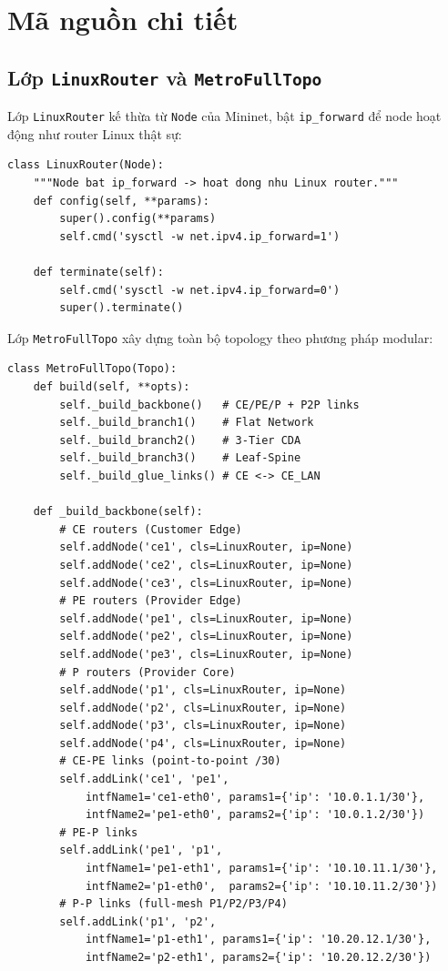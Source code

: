\section{Mã nguồn chi tiết}

\subsection{Lớp \texttt{LinuxRouter} và \texttt{MetroFullTopo}}

Lớp \texttt{LinuxRouter} kế thừa từ \texttt{Node} của Mininet, bật \texttt{ip\_forward} để node hoạt động như router Linux thật sự:

\begin{lstlisting}[style=pythonstyle, caption={Lớp LinuxRouter -- node hoạt động như IP router}]
class LinuxRouter(Node):
    """Node bat ip_forward -> hoat dong nhu Linux router."""
    def config(self, **params):
        super().config(**params)
        self.cmd('sysctl -w net.ipv4.ip_forward=1')

    def terminate(self):
        self.cmd('sysctl -w net.ipv4.ip_forward=0')
        super().terminate()
\end{lstlisting}

Lớp \texttt{MetroFullTopo} xây dựng toàn bộ topology theo phương pháp modular:

\begin{lstlisting}[style=pythonstyle, caption={Lớp MetroFullTopo -- xây dựng topology modular}]
class MetroFullTopo(Topo):
    def build(self, **opts):
        self._build_backbone()   # CE/PE/P + P2P links
        self._build_branch1()    # Flat Network
        self._build_branch2()    # 3-Tier CDA
        self._build_branch3()    # Leaf-Spine
        self._build_glue_links() # CE <-> CE_LAN

    def _build_backbone(self):
        # CE routers (Customer Edge)
        self.addNode('ce1', cls=LinuxRouter, ip=None)
        self.addNode('ce2', cls=LinuxRouter, ip=None)
        self.addNode('ce3', cls=LinuxRouter, ip=None)
        # PE routers (Provider Edge)
        self.addNode('pe1', cls=LinuxRouter, ip=None)
        self.addNode('pe2', cls=LinuxRouter, ip=None)
        self.addNode('pe3', cls=LinuxRouter, ip=None)
        # P routers (Provider Core)
        self.addNode('p1', cls=LinuxRouter, ip=None)
        self.addNode('p2', cls=LinuxRouter, ip=None)
        self.addNode('p3', cls=LinuxRouter, ip=None)
        self.addNode('p4', cls=LinuxRouter, ip=None)
        # CE-PE links (point-to-point /30)
        self.addLink('ce1', 'pe1',
            intfName1='ce1-eth0', params1={'ip': '10.0.1.1/30'},
            intfName2='pe1-eth0', params2={'ip': '10.0.1.2/30'})
        # PE-P links
        self.addLink('pe1', 'p1',
            intfName1='pe1-eth1', params1={'ip': '10.10.11.1/30'},
            intfName2='p1-eth0',  params2={'ip': '10.10.11.2/30'})
        # P-P links (full-mesh P1/P2/P3/P4)
        self.addLink('p1', 'p2',
            intfName1='p1-eth1', params1={'ip': '10.20.12.1/30'},
            intfName2='p2-eth1', params2={'ip': '10.20.12.2/30'})
\end{lstlisting}



